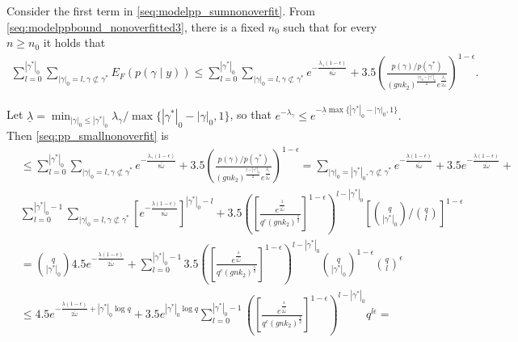 Consider the first term in \eqref{seq:modelpp_sumnonoverfit}. From \eqref{seq:modelppbound_nonoverfitted3}, there is a fixed $n_0$ such that for every $n \geq n_0$ it holds that
\begin{align}
 \sum_{l=0}^{|\gamma^*|_0} \sum_{|\gamma|_0= l, \gamma \not\subset \gamma^*} E_F(p(\gamma \mid y)) \leq
\sum_{l=0}^{|\gamma^*|_0} \sum_{|\gamma|_0= l, \gamma \not\subset \gamma^*} e^{ -\frac{\lambda_\gamma (1-\epsilon)}{8\tilde{\omega}}}
+ 3.5 \left( \frac{ p(\gamma)/p(\gamma^*) }{(gnk_2)^{\frac{|\gamma|_0 - |\gamma^*|_0}{2}} e^{\frac{\lambda_\gamma}{2 \tilde{\omega}}}} \right)^{1-\epsilon}.
\label{seq:pp_smallnonoverfit}
\end{align}

Let $\underline{\lambda}= \min_{|\gamma|_0 \leq |\gamma^*|_0} \lambda_\gamma/\max\{|\gamma^*|_0-|\gamma|_0,1\}$, so that
$
 e^{-\lambda_\gamma} \leq e^{-\underline{\lambda} \max\{|\gamma^*|_0 - |\gamma|_0,1\}}.
$
Then \eqref{seq:pp_smallnonoverfit} is
\begin{align}
&\leq 
\sum_{l=0}^{|\gamma^*|_0} \sum_{|\gamma|_0= l, \gamma \not\subset \gamma^*} e^{ -\frac{\lambda_\gamma (1-\epsilon)}{8\tilde{\omega}}}
+ 3.5 \left( \frac{ p(\gamma)/p(\gamma^*) }{(gnk_2)^{\frac{l - |\gamma^*|_0}{2}} e^{\frac{\lambda_\gamma}{2 \tilde{\omega}}}} \right)^{1-\epsilon}
=
\sum_{|\gamma|_0= |\gamma^*|_0, \gamma \not\subset \gamma^*} e^{ -\frac{\underline{\lambda} (1-\epsilon)}{8\tilde{\omega}}} + 3.5 e^{-\frac{\underline{\lambda}(1-\epsilon)}{2 \tilde{\omega}}} +
\nonumber \\
& \sum_{l=0}^{|\gamma^*|_0-1} \sum_{|\gamma|_0= l, \gamma \not\subset \gamma^*} \left[ e^{ -\frac{\underline{\lambda} (1-\epsilon)}{8\tilde{\omega}}} \right]^{|\gamma^*|_0 - l}
+ 3.5 \left( \left[ \frac{ e^{\frac{\underline{\lambda}}{2 \tilde{\omega}}} }{q^c (gnk_2)^{\frac{1}{2}}} \right]^{1-\epsilon} \right)^{l - |\gamma^*|_0}
\left[ {q \choose |\gamma^*|_0 }/ {q \choose l} \right]^{1-\epsilon}
\nonumber \\
&={q \choose |\gamma^*|_0}
4.5 e^{-\frac{\underline{\lambda}(1-\epsilon)}{2 \tilde{\omega}}} +
\sum_{l=0}^{|\gamma^*|_0-1} 
3.5 \left( \left[ \frac{ e^{\frac{\underline{\lambda}}{2 \tilde{\omega}}} }{q^c (gnk_2)^{\frac{1}{2}}} \right]^{1-\epsilon} \right)^{l - |\gamma^*|_0}
{q \choose |\gamma^*|_0 }^{1-\epsilon}  {q \choose l}^{\epsilon}
\nonumber \\
& \leq 4.5 e^{-\frac{\underline{\lambda}(1-\epsilon)}{2 \tilde{\omega}} + |\gamma^*|_0\log q} +
3.5 e^{|\gamma^*|_0 \log q} \sum_{l=0}^{|\gamma^*|_0-1} 
 \left( \left[ \frac{ e^{\frac{\underline{\lambda}}{2 \tilde{\omega}}} }{q^c (gnk_2)^{\frac{1}{2}}} \right]^{1-\epsilon} \right)^{l - |\gamma^*|_0}
q^{l \epsilon}=
\nonumber
\end{align}
